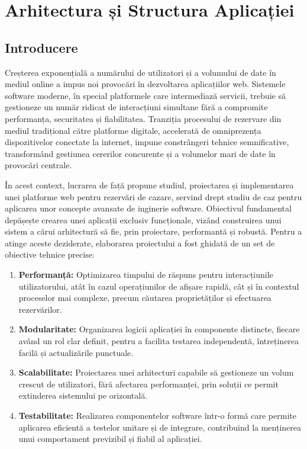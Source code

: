 \documentclass[12pt, a4paper, oneside, romanian]{teza-upb}
\begin{document}
\chapter{Arhitectura și Structura Aplicației}

\section{Introducere}
\label{sec:filozofie_arhitectura}

Creșterea exponențială a numărului de utilizatori și a volumului de date în mediul online a impus noi provocări în dezvoltarea aplicațiilor web. Sistemele software moderne, în special platformele care intermediază servicii, trebuie să gestioneze un număr ridicat de interacțiuni simultane fără a compromite performanța, securitatea și fiabilitatea. Tranziția procesului de rezervare din mediul tradițional către platforme digitale, accelerată de omniprezența dispozitivelor conectate la internet, impune constrângeri tehnice semnificative, transformând gestiunea cererilor concurente și a volumelor mari de date în provocări centrale.

În acest context, lucrarea de față propune studiul, proiectarea și implementarea unei platforme web pentru rezervări de cazare, servind drept studiu de caz pentru aplicarea unor concepte avansate de inginerie software. Obiectivul fundamental depășește crearea unei aplicații exclusiv funcționale, vizând construirea unui sistem a cărui arhitectură să fie, prin proiectare, performantă și robustă. Pentru a atinge aceste deziderate, elaborarea proiectului a fost ghidată de un set de obiective tehnice precise:
\begin{enumerate}
	\item \textbf{Performanță:} Optimizarea timpului de răspuns pentru interacțiunile utilizatorului, atât în cazul operațiunilor de afișare rapidă, cât și în contextul proceselor mai complexe, precum căutarea proprietăților și efectuarea rezervărilor.
	
	\item \textbf{Modularitate:} Organizarea logicii aplicației în componente distincte, fiecare având un rol clar definit, pentru a facilita testarea independentă, întreținerea facilă și actualizările punctuale.
	
	\item \textbf{Scalabilitate:} Proiectarea unei arhitecturi capabile să gestioneze un volum crescut de utilizatori, fără afectarea performanței, prin soluții ce permit extinderea sistemului pe orizontală.
	
	\item \textbf{Testabilitate:} Realizarea componentelor software într-o formă care permite aplicarea eficientă a testelor unitare și de integrare, contribuind la menținerea unui comportament previzibil și fiabil al aplicației.
\end{enumerate}
\end{document}
